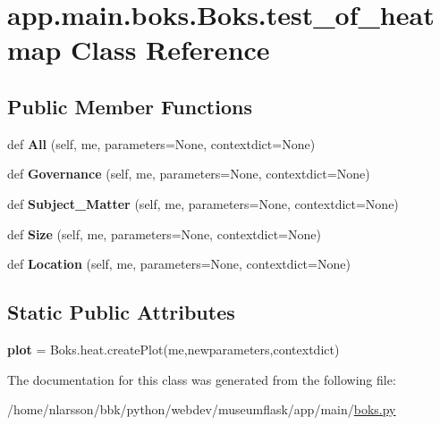 \hypertarget{classapp_1_1main_1_1boks_1_1Boks_1_1test__of__heatmap}{}\section{app.\+main.\+boks.\+Boks.\+test\+\_\+of\+\_\+heatmap Class Reference}
\label{classapp_1_1main_1_1boks_1_1Boks_1_1test__of__heatmap}
\subsection*{Public Member Functions}
\begin{DoxyCompactItemize}
\item 
\mbox{\label{classapp_1_1main_1_1boks_1_1Boks_1_1test__of__heatmap_a3ac125e18f531116c7d812114b9796b7}} 
def {\bfseries All} (self, me, parameters=None, contextdict=None)
\item 
\mbox{\label{classapp_1_1main_1_1boks_1_1Boks_1_1test__of__heatmap_aa2875e15f2a7cace7df51f9c91b6b1e8}} 
def {\bfseries Governance} (self, me, parameters=None, contextdict=None)
\item 
\mbox{\label{classapp_1_1main_1_1boks_1_1Boks_1_1test__of__heatmap_a12953d53feb4de6296ded4734b9d6596}} 
def {\bfseries Subject\+\_\+\+Matter} (self, me, parameters=None, contextdict=None)
\item 
\mbox{\label{classapp_1_1main_1_1boks_1_1Boks_1_1test__of__heatmap_adddb7abe4cb8a2d03a0dfaabfbbbd878}} 
def {\bfseries Size} (self, me, parameters=None, contextdict=None)
\item 
\mbox{\label{classapp_1_1main_1_1boks_1_1Boks_1_1test__of__heatmap_a63231387dcade064cefec49faef6b158}} 
def {\bfseries Location} (self, me, parameters=None, contextdict=None)
\end{DoxyCompactItemize}
\subsection*{Static Public Attributes}
\begin{DoxyCompactItemize}
\item 
\mbox{\label{classapp_1_1main_1_1boks_1_1Boks_1_1test__of__heatmap_a20849fe82485fecf879d36da39fef282}} 
{\bfseries plot} = Boks.\+heat.\+create\+Plot(me,newparameters,contextdict)
\end{DoxyCompactItemize}


The documentation for this class was generated from the following file\+:\begin{DoxyCompactItemize}
\item 
/home/nlarsson/bbk/python/webdev/museumflask/app/main/\mbox{\hyperlink{boks_8py}{boks.\+py}}\end{DoxyCompactItemize}
